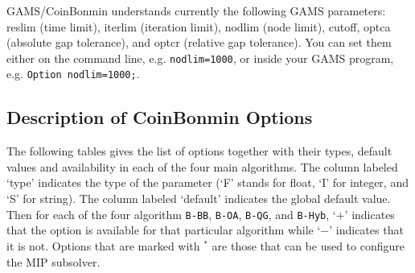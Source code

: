 GAMS/CoinBonmin understands currently the following GAMS parameters: reslim (time limit), iterlim (iteration limit), nodlim (node limit), cutoff, optca (absolute gap tolerance), and optcr (relative gap tolerance).
You can set them either on the command line, e.g. \verb+nodlim=1000+, or inside your GAMS program, e.g. \verb+Option nodlim=1000;+.

\subsection{Description of CoinBonmin Options}
\label{sub:bonminoptions}

The following tables gives the list of options together with their types, default values and availability in each of the four main algorithms.
The column labeled `type' indicates the type of the parameter (`F' stands for float, `I' for integer, and `S' for
string).
The column labeled `default' indicates the global default value.
Then for each of the four algorithm \texttt{B-BB}, \texttt{B-OA}, \texttt{B-QG}, and \texttt{B-Hyb}, `$+$' indicates that the option is available for that particular algorithm while `$-$' indicates that it is not.
Options that are marked with $^*$ are those that can be used to configure the MIP subsolver.

